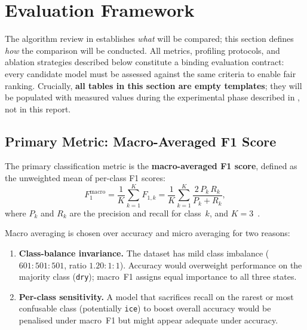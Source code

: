 
\section{Evaluation Framework}\label{sec:eval}

The algorithm review in  establishes \emph{what}
will be compared; this section defines \emph{how} the comparison will
be conducted.  All metrics, profiling protocols, and ablation
strategies described below constitute a binding evaluation contract:
every candidate model must be assessed against the same criteria to
enable fair ranking.  Crucially, \textbf{all tables in this section
are empty templates}; they will be populated with measured values during
the experimental phase described in , not in this
report.


\subsection{Primary Metric: Macro-Averaged F1 Score}
\label{subsec:macro_f1}

The primary classification metric is the \textbf{macro-averaged F1
score}, defined as the unweighted mean of per-class F1 scores:
%
\begin{equation}\label{eq:macro_f1}
  F_{1}^{\text{macro}}
  = \frac{1}{K} \sum_{k=1}^{K} F_{1,k}
  = \frac{1}{K} \sum_{k=1}^{K}
    \frac{2 \, P_k \, R_k}{P_k + R_k},
\end{equation}
%
where $P_k$ and $R_k$ are the precision and recall for class~$k$,
and $K = 3$~\cite{sokolova2009f1}.

Macro averaging is chosen over accuracy and micro averaging for two
reasons:
%
\begin{enumerate}
  \item \textbf{Class-balance invariance.}  The dataset has mild class
        imbalance ($601 : 501 : 501$, ratio $1.20 : 1 : 1$).  Accuracy
        would overweight performance on the majority class
        (\texttt{dry}); macro~F1 assigns equal importance to all three
        states.
  \item \textbf{Per-class sensitivity.}  A model that sacrifices recall
        on the rarest or most confusable class (potentially
        \texttt{ice}) to boost overall accuracy would be penalised
        under macro~F1 but might appear adequate under accuracy.
\end{enumerate}


